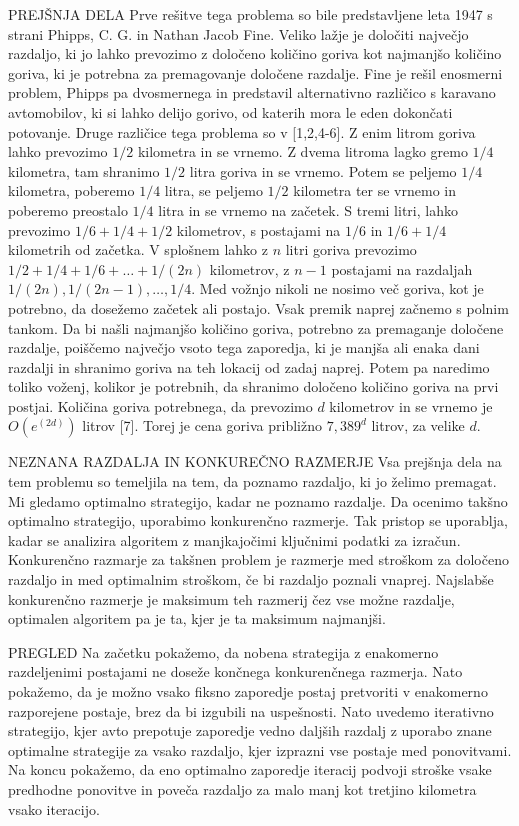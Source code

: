 PREJŠNJA DELA
Prve rešitve tega problema so bile predstavljene leta 1947 s strani Phipps, C. G. in Nathan Jacob Fine. Veliko lažje je določiti največjo razdaljo, ki jo lahko prevozimo z določeno količino goriva kot najmanjšo 
količino goriva, ki je potrebna za premagovanje določene razdalje. Fine je rešil enosmerni problem, Phipps pa dvosmernega in predstavil alternativno različico s karavano
avtomobilov, ki si lahko delijo gorivo, od katerih mora le eden dokončati potovanje. Druge različice tega problema so v [1,2,4-6].
Z enim litrom goriva lahko prevozimo $1/2$ kilometra in se vrnemo. Z dvema litroma lagko gremo $1/4$ kilometra, tam shranimo $1/2$ litra goriva in se vrnemo. 
Potem se peljemo $1/4$ kilometra, poberemo $1/4$ litra, se peljemo $1/2$ kilometra ter se vrnemo in poberemo preostalo $1/4$ litra in se vrnemo na začetek.
S tremi litri, lahko prevozimo $1/6 + 1/4 + 1/2$ kilometrov, s postajami na $1/6$ in $1/6 + 1/4$  kilometrih od začetka. V splošnem lahko z $n$ litri goriva 
prevozimo $1/2 + 1/4 + 1/6 + \dots + 1/(2n)$ kilometrov, z $n-1$ postajami na razdaljah $1/(2n), 1/(2n-1), \dots , 1/4$. Med vožnjo nikoli ne nosimo več goriva, 
kot je potrebno, da dosežemo začetek ali postajo. Vsak premik naprej začnemo s polnim tankom. Da bi našli najmanjšo količino goriva, potrebno za premaganje določene razdalje, 
poiščemo največjo vsoto tega zaporedja, ki je manjša ali enaka dani razdalji in shranimo goriva na teh lokacij od zadaj naprej. Potem pa naredimo toliko voženj, kolikor 
je potrebnih, da shranimo določeno količino goriva na prvi postjai. 
Količina goriva potrebnega, da prevozimo $d$ kilometrov in se vrnemo je $O(e^(2d))$ litrov [7].  Torej je cena goriva približno $7,389^d$ litrov, za velike $d$.

NEZNANA RAZDALJA IN KONKUREČNO RAZMERJE
Vsa prejšnja dela na tem problemu so temeljila na tem, da poznamo razdaljo, ki jo želimo premagat. Mi gledamo optimalno strategijo, kadar ne poznamo razdalje. 
Da ocenimo takšno optimalno strategijo, uporabimo konkurenčno razmerje. Tak pristop se uporablja, kadar se analizira algoritem z manjkajočimi ključnimi podatki za izračun.
Konkurenčno razmarje za takšnen problem je razmerje med stroškom za določeno razdaljo in med
optimalnim stroškom, če bi razdaljo poznali vnaprej. Najslabše konkurenčno razmerje je maksimum teh razmerij čez vse možne razdalje, optimalen algoritem pa je ta, kjer je ta 
maksimum najmanjši.

PREGLED
Na začetku pokažemo, da nobena strategija z enakomerno razdeljenimi postajami ne doseže končnega konkurenčnega razmerja. Nato pokažemo, da 
je možno vsako fiksno zaporedje postaj pretvoriti v enakomerno razporejene postaje, brez da bi izgubili na uspešnosti. Nato uvedemo iterativno strategijo, kjer avto prepotuje zaporedje vedno daljših razdalj 
z uporabo znane optimalne strategije za vsako razdaljo, kjer izprazni vse postaje med ponovitvami. Na koncu pokažemo, da eno optimalno zaporedje iteracij podvoji stroške vsake 
predhodne ponovitve in poveča razdaljo za malo manj kot tretjino kilometra vsako iteracijo.

